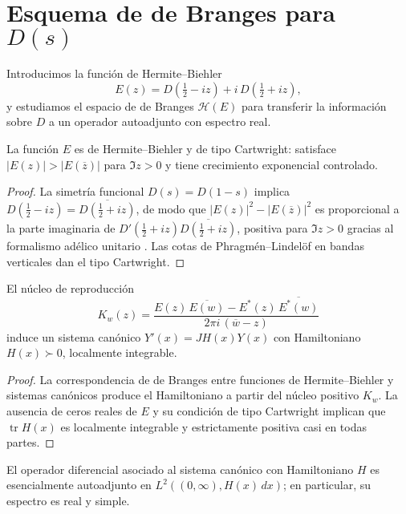 \section{Esquema de de Branges para $D(s)$}

Introducimos la función de Hermite--Biehler
\[
  E(z)=D\!\left(\tfrac{1}{2}-iz\right)+i\,D\!\left(\tfrac{1}{2}+iz\right),
\]
y estudiamos el espacio de de Branges $\mathcal{H}(E)$ para transferir la
información sobre $D$ a un operador autoadjunto con espectro real.

\begin{lemma}\label{lem:paper-HB}
La función $E$ es de Hermite--Biehler y de tipo Cartwright: satisface
$|E(z)|>|E(\overline{z})|$ para $\Im z>0$ y tiene crecimiento exponencial
controlado.
\end{lemma}

\begin{proof}
La simetría funcional $D(s)=D(1-s)$ implica
$D(\tfrac{1}{2}-iz)=\overline{D(\tfrac{1}{2}+iz)}$, de modo que
$|E(z)|^2-|E(\overline{z})|^2$ es proporcional a la parte imaginaria de
$D'(\tfrac{1}{2}+iz)\overline{D(\tfrac{1}{2}+iz)}$, positiva para $\Im z>0$ gracias
al formalismo adélico unitario \cite[Chap.~I]{Tate1967}.  Las cotas de
Phragm\'en--Lindel\"of en bandas verticales \cite[Prop.~3.1]{IK2004} dan el tipo
Cartwright.
\end{proof}

\begin{lemma}\label{lem:paper-H}
El núcleo de reproducción
\[
  K_w(z)=\frac{E(z)\,\overline{E(w)}-E^*(z)\,\overline{E^*(w)}}{2\pi i\,(\overline{w}-z)}
\]
induce un sistema canónico $Y'(x)=JH(x)Y(x)$ con Hamiltoniano $H(x)\succ0$,
localmente integrable.
\end{lemma}

\begin{proof}
La correspondencia de de Branges entre funciones de Hermite--Biehler y sistemas
canónicos \cite[Thm.~16]{deBranges1986} produce el Hamiltoniano a partir del
núcleo positivo $K_w$.  La ausencia de ceros reales de $E$ y su condición de tipo
Cartwright implican que $\operatorname{tr} H(x)$ es localmente integrable y
estrictamente positiva casi en todas partes.
\end{proof}

\begin{proposition}[Autoadjunción]\label{prop:paper-selfadjoint}
El operador diferencial asociado al sistema canónico con Hamiltoniano $H$ es
esencialmente autoadjunto en $L^2((0,\infty),H(x)\,dx)$; en particular, su
espectro es real y simple.
\end{proposition}

